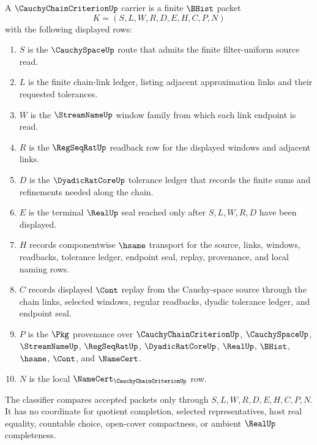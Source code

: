 \begin{definition}
\label{def:cauchy-chain-criterion-carrier}
A $\CauchyChainCriterionUp$ carrier is a finite $\BHist$ packet
$$
K=(S,L,W,R,D,E,H,C,P,N)
$$
with the following displayed rows:
\begin{enumerate}
\item $S$ is the $\CauchySpaceUp$ route that admits the finite filter-uniform source read.
\item $L$ is the finite chain-link ledger, listing adjacent approximation links and their requested tolerances.
\item $W$ is the $\StreamNameUp$ window family from which each link endpoint is read.
\item $R$ is the $\RegSeqRatUp$ readback row for the displayed windows and adjacent links.
\item $D$ is the $\DyadicRatCoreUp$ tolerance ledger that records the finite sums and refinements needed along the chain.
\item $E$ is the terminal $\RealUp$ seal reached only after $S,L,W,R,D$ have been displayed.
\item $H$ records componentwise $\hsame$ transport for the source, links, windows, readbacks, tolerance ledger, endpoint seal, replay, provenance, and local naming rows.
\item $C$ records displayed $\Cont$ replay from the Cauchy-space source through the chain links, selected windows, regular readbacks, dyadic tolerance ledger, and endpoint seal.
\item $P$ is the $\Pkg$ provenance over $\CauchyChainCriterionUp$, $\CauchySpaceUp$, $\StreamNameUp$, $\RegSeqRatUp$, $\DyadicRatCoreUp$, $\RealUp$, $\BHist$, $\hsame$, $\Cont$, and $\NameCert$.
\item $N$ is the local $\NameCert_{\CauchyChainCriterionUp}$ row.
\end{enumerate}
The classifier compares accepted packets only through $S,L,W,R,D,E,H,C,P,N$. It has no coordinate for quotient completion, selected representatives, host real equality, countable choice, open-cover compactness, or ambient $\RealUp$ completeness.
\end{definition}

